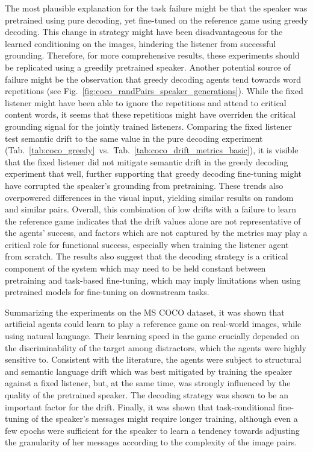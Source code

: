 The most plausible explanation for the task failure might be that the speaker was pretrained using pure decoding, yet fine-tuned on the reference game using greedy decoding. This change in strategy might have been disadvantageous for the learned conditioning on the images, hindering the listener from successful grounding. Therefore, for more comprehensive results, these experiments should be replicated using a greedily pretrained speaker. Another potential source of failure might be the observation that greedy decoding agents tend towards word repetitions \parencite[cf.][]{lee2019countering} (see Fig.~\ref{fig:coco_randPairs_speaker_generations}). While the fixed listener might have been able to ignore the repetitions and attend to critical content words, it seems that these repetitions might have overriden the critical grounding signal for the jointly trained listeners. Comparing the fixed listener test semantic drift to the same value in the pure decoding experiment (Tab.~\ref{tab:coco_greedy}~vs.~Tab.~\ref{tab:coco_drift_metrics_basic}), it is visible that the fixed listener did not mitigate semantic drift in the greedy decoding experiment that well, further supporting that greedy decoding fine-tuning might have corrupted the speaker's grounding from pretraining. 
These trends also overpowered differences in the visual input, yielding similar results on random and similar pairs.
Overall, this combination of low drifts with a failure to learn the reference game indicates that the drift values alone are not representative of the agents' success, and factors which are not captured by the metrics may play a critical role for functional success, especially when training the listener agent from scratch. The results also suggest that the decoding strategy is a critical component of the system which may need to be held constant between pretraining and task-based fine-tuning, which may imply limitations when using pretrained models for fine-tuning on downstream tasks.

Summarizing the experiments on the MS COCO dataset, it was shown that artificial agents could learn to play a reference game on real-world images, while using natural language. Their learning speed in the game crucially depended on the discriminability of the target among distractors, which the agents were highly sensitive to. Consistent with the literature, the agents were subject to structural and semantic language drift which was best mitigated by training the speaker against a fixed listener, but, at the same time, was strongly influenced by the quality of the pretrained speaker. The decoding strategy was shown to be an important factor for the drift. Finally, it was shown that task-conditional fine-tuning of the speaker's messages might require longer training, although even a few epochs were sufficient for the speaker to learn a tendency towards adjusting the granularity of her messages according to the complexity of the image pairs.

